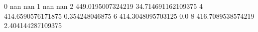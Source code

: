 0 nan nan
1 nan nan
2 449.0195007324219 34.714691162109375
4 414.6590576171875 0.354248046875
6 414.3048095703125 0.0
8 416.7089538574219 2.404144287109375
